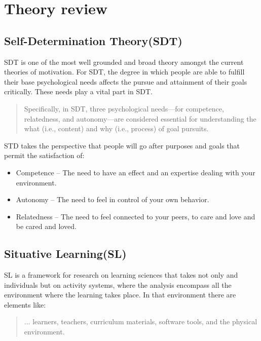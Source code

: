 \section{Theory review}

\subsection{Self-Determination Theory(SDT)}

SDT is one of the most well grounded
\cite{motivation:handbook_self_determination} and broad theory amongst the
current theories of motivation. For SDT, the degree in which people are able to
fulfill their base psychological needs affects the pursue and attainment of
their goals critically. These needs play a vital part in SDT.

\begin{quote}
    Specifically, in SDT, three psychological needs—for competence, relatedness, and
    autonomy—are considered essential for understanding the what (i.e., content) and
    why (i.e., process) of goal pursuits. \cite{motivation:ryan_deci__what_and_why} 
\end{quote}

STD takes the perspective that people will go after purposes and goals that
permit the satisfaction of: \cite{motivation:ryan_deci__what_and_why} 

\begin{itemize}
    \item Competence -- The need to have an effect and an expertise dealing with
    your environment.
    \item Autonomy -- The need to feel in control of your own behavior.
    \item Relatedness -- The need to feel connected to your peers, to care and
    love and be cared and loved.
\end{itemize} 

\subsection{Situative Learning(SL)}

SL is a framework for research on learning sciences that takes not only and
individuals but on activity systems, where the analysis encompass all the
environment where the learning takes place. In that environment there are
elements like:

\begin{quote}
    ... learners, teachers, curriculum materials, software tools, and the
    physical environment.
    \cite{education:greeno__learning_activity} 
\end{quote}



